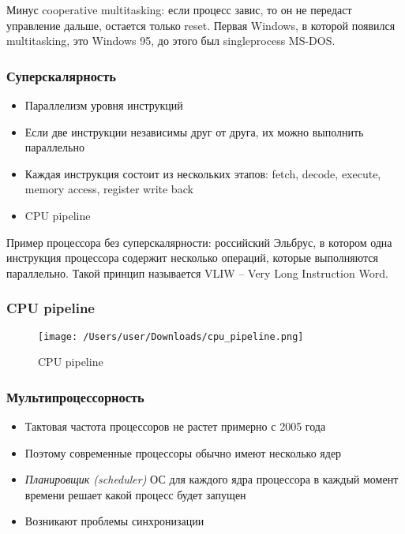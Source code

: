     Минус cooperative multitasking: если процесс завис, то он не передаст управление дальше, остается только reset.\newline
    Первая Windows, в которой появился multitasking, это Windows 95, до этого был singleprocess MS-DOS.
    
    \subsubsection{Суперскалярность}
    \begin{itemize}
      \item Параллелизм уровня инструкций
      \item Если две инструкции независимы друг от друга, их можно выполнить параллельно
      \item Каждая инструкция состоит из нескольких этапов: fetch, decode, execute, memory access, register write back
      \item CPU pipeline
    \end{itemize}
    Пример процессора без суперскалярности: российский Эльбрус, в котором одна инструкция процессора содержит несколько операций, которые выполняются параллельно. Такой принцип называется VLIW -- Very Long Instruction Word.
    
    \subsubsection{CPU pipeline}
    \begin{figure}[h!]
  \texttt{[image: /Users/user/Downloads/cpu\_pipeline.png]}
  \caption{CPU pipeline}
  \label{fig:pipeline}
\end{figure}
    
    \subsubsection{Мультипроцессорность}
    \begin{itemize}
      \item Тактовая частота процессоров не растет примерно с 2005 года
      \item Поэтому современные процессоры обычно имеют несколько ядер
      \item \textit{Планировщик (scheduler)} ОС для каждого ядра процессора в каждый момент времени решает какой процесс будет запущен
      \item Возникают проблемы синхронизации
    \end{itemize}
    
